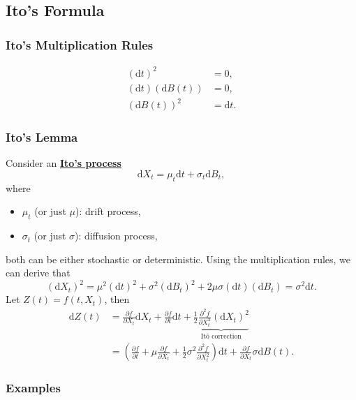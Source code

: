 \documentclass[twocolumn,landscape,10pt]{article}
\theoremstyle{definition}
\begin{document}
\subsection{Ito's Formula}

\subsubsection{Ito's Multiplication Rules}

\begin{align*}
    {(\mathrm{d}t)}^{2} &= 0, \\
    (\mathrm{d}t)(\mathrm{d}B(t)) &= 0, \\
    (\mathrm{d}B(t))^2 &= \mathrm{d}t.
\end{align*}

\subsubsection{Ito's Lemma}

Consider an \textbf{\underline{Ito's process}}
\[
    \mathrm{d}X_t = \mu_t\mathrm{d}t + \sigma_t\mathrm{d}B_t,
\]
where
\begin{itemize}
    \item $\mu_t$ (or just $\mu$): drift process,
    \item $\sigma_t$ (or just $\sigma$): diffusion process,
\end{itemize}
both can be either stochastic or deterministic.
Using the multiplication rules, we can derive that
\[
    {(\mathrm{d}X_t)}^{2}=\mu^2(\mathrm{d}t)^2+\sigma^2(\mathrm{d}B_t)^2
    +2\mu\sigma(\mathrm{d}t)(\mathrm{d}B_t)=\sigma^2\mathrm{d}t.
\]
Let $Z(t)=f(t,X_t)$, then
\begin{align*}
    \mathrm{d}Z(t)
    &= \frac{\partial f}{\partial X_t}\mathrm{d}X_t
    +\frac{\partial f}{\partial t}\mathrm{d}t
    +\underbrace{\frac{1}{2}\frac{\partial^2 f}{\partial
    X_t^2}{(\mathrm{d}X_t)}^{2}}_{\text{It\^{o} correction}} \\
    &= \left(\frac{\partial f}{\partial t}
    +\mu\frac{\partial f}{\partial X_t} 
    +\frac{1}{2}\sigma^2\frac{\partial^2 f}{\partial X_t^2}\right)\mathrm{d}t
    +\frac{\partial f}{\partial X_t}\sigma\mathrm{d}B(t).
\end{align*}

\subsubsection{Examples}
\end{document}

